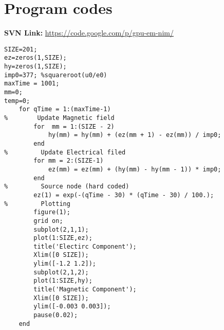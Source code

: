 
\chapter{Program codes} %

\label{AppendixA} %


\textbf{SVN Link:} \url{https://code.google.com/p/gpu-em-nim/}

\begin{lstlisting}
SIZE=201;
ez=zeros(1,SIZE);
hy=zeros(1,SIZE);
imp0=377; %squareroot(u0/e0)
maxTime = 1001;
mm=0;
temp=0;
    for qTime = 1:(maxTime-1)
%        Update Magnetic field
        for  mm = 1:(SIZE - 2)
            hy(mm) = hy(mm) + (ez(mm + 1) - ez(mm)) / imp0;
        end
%         Update Electrical filed
        for mm = 2:(SIZE-1)
            ez(mm) = ez(mm) + (hy(mm) - hy(mm - 1)) * imp0;
        end
%         Source node (hard coded)
        ez(1) = exp(-(qTime - 30) * (qTime - 30) / 100.);
%         Plotting
        figure(1);
        grid on; 
        subplot(2,1,1);
        plot(1:SIZE,ez);
        title('Electirc Component');
        Xlim([0 SIZE]);
        ylim([-1.2 1.2]);
        subplot(2,1,2);
        plot(1:SIZE,hy);
        title('Magnetic Component');
        Xlim([0 SIZE]);
        ylim([-0.003 0.003]);
        pause(0.02);
    end
	
\end{lstlisting}


